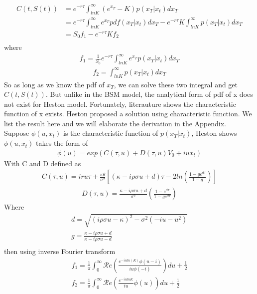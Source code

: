 \documentclass[a4paper]{article}
\begin{document}
\begin{align*}
	C(t, S(t)) & = e^{ -r \tau } \int_{lnK}^{\infty} (e^{x_T} - K) p(x_T| x_t) dx_T \\
		   & = e^{-r \tau}\int_{lnK}^{\infty} e^{x_T} pdf(x_T| x_t) dx_T 
		   - e^{-r\tau} K \int_{lnK}^{\infty}  p(x_T | x_t) dx_T \\
		   & = S_0 f_1 -  e^{-r \tau} K f_2\\
\end{align*}
where 
\begin{align*}
	f_1 = \frac{1}{S_0} e^{-r \tau}\int_{lnK}^{\infty} e^{x_T} p(x_T | x_t) dx_T
\end{align*}
\begin{align*}
	f_2 = \int_{lnK}^{\infty}  p(x_T | x_t) dx_T
\end{align*}
So as long as we know the pdf of $x_T$, we can solve these two integral and get $C(t, S(t))$. But unlike in the BSM model, the analytical form of pdf of x does not exist for Heston model. Fortunately, literauture shows the characteristic function of x exists. Heston \cite{heston} proposed a solution using characteristic function. We list the result here and we will elaborate the derivation in the Appendix. \\
Suppose $\phi(u, x_t)$ is the characteristic function of $p(x_T| x_t)$, Heston shows $\phi(u,x_t)$ takes the form of
\begin{align*}
	\phi(u) = exp(C(\tau, u) + D(\tau, u)V_0 + iux_t)
\end{align*}
With C and D defined as
\begin{align} 
	C(\tau, u) = iru\tau + \frac{\kappa \theta}{\sigma^2}
	[(\kappa - i\rho \sigma u + d)\tau - 2ln(\frac{1 - g e^{d\tau}}{1 - g})] \label{heston_C}
\end{align}
\begin{align} 
	D(\tau, u) = \frac{\kappa - i\rho \sigma u + d}{\sigma^2} (\frac{1 - e^{d\tau}}{1-ge^{d\tau}})
		\label{heston_D}
\end{align}
Where
\begin{align*}
	d = \sqrt{(i\rho \sigma u - \kappa)^2 - \sigma^2(-i  u - u^2)} \\
	g = \frac{\kappa - i \rho \sigma u + d}{\kappa - i \rho \sigma u -d} \\
\end{align*}
then using inverse Fourier transform
\begin{align*}
	f_1 = \frac{1}{\pi} \int_{0}^{\infty}\mathcal Re(\frac{e^{-iuln(K)}\phi(u-i)}{iu\phi(-i)})du +\frac{1}{2} \\
	f_2 = \frac{1}{\pi} \int_{0}^{\infty}\mathcal Re( \frac{e^{-i u lnK}}{iu} \phi(u))  du + \frac{1}{2} \\
\end{align*}
\end{document}
